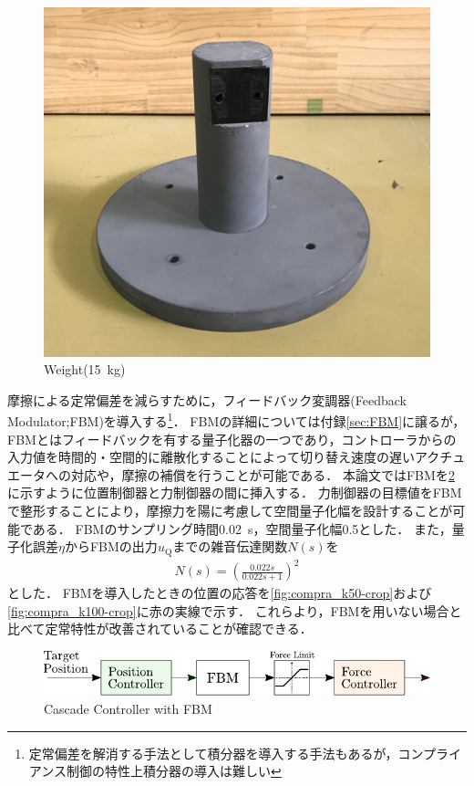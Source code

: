 \begin{figure}[t]
    \centering
        \includegraphics[keepaspectratio, width = .6\linewidth]{contents/IntegrationControl/figure/weigth.png}
        \caption{Weight(\SI{15}{kg})}
        \label{fig:omori}
\end{figure}

摩擦による定常偏差を減らすために，フィードバック変調器(Feedback Modulator;FBM)を導入する\footnote{定常偏差を解消する手法として積分器を導入する手法もあるが，コンプライアンス制御の特性上積分器の導入は難しい}\cite{石川将人2007,石川将人2008フィードバック変調器を用いた離散値入力制御におけるアクチュエータ非線形性の補償}．
FBMの詳細については付録\ref{sec:FBM}に譲るが，FBMとはフィードバックを有する量子化器の一つであり，コントローラからの入力値を時間的・空間的に離散化することによって切り替え速度の遅いアクチュエータへの対応や，摩擦の補償を行うことが可能である\cite{石川将人2008フィードバック変調器を用いた離散値入力制御におけるアクチュエータ非線形性の補償,佐藤順紀2013不等間隔量子化入力とアクチュエータの非線形要素モデルを用いたフィードバック変調器による油圧駆動システムの軌道制御,Ohgi_2008jrm}．
本論文ではFBMを\figname\ref{fig:casquade_torqueandposition_FBM}に示すように位置制御器と力制御器の間に挿入する．
力制御器の目標値をFBMで整形することにより，摩擦力を陽に考慮して空間量子化幅を設計することが可能である．
FBMのサンプリング時間\SI{0.02}{s}，空間量子化幅0.5とした．
また，量子化誤差$\eta$からFBMの出力$u_\mathrm{Q}$までの雑音伝達関数$N(s)$を
\begin{align}
    \label{eq:Ns}
    N(s) = \left( \frac{0.022s}{0.022s+1} \right)^2
\end{align}
とした．
FBMを導入したときの位置の応答を\figname\ref{fig:compra_k50-crop}および\figname\ref{fig:compra_k100-crop}に赤の実線で示す．
これらより，FBMを用いない場合と比べて定常特性が改善されていることが確認できる．
\begin{figure}[t]
    \centering
        \includegraphics[keepaspectratio, scale=1.0]{contents/IntegrationControl/figure/casquade_torqueandposition_FBM.pdf}
        \caption{Cascade Controller with FBM}
        \label{fig:casquade_torqueandposition_FBM}
\end{figure}

